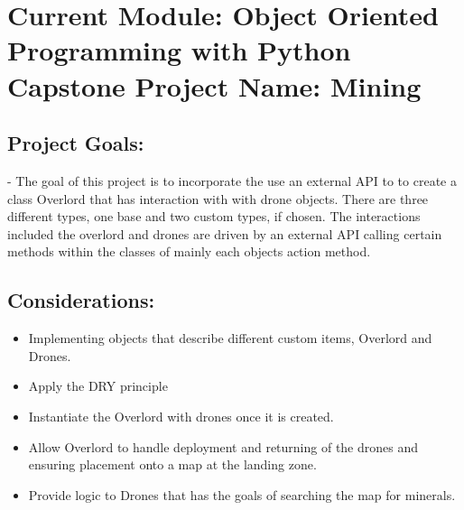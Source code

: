 \documentclass{article}
\begin{document}
\author{Guidry, Joseph}
\date{\ 22 SEPT 2017}

\section{Current Module: Object Oriented Programming with Python Capstone
Project Name:  Mining}

\subsection{Project Goals:}
	- The goal of this project is to incorporate the use an external API to to create a class Overlord that has interaction with with drone objects. There are three different types, one base and two custom types, if chosen.  The interactions included the overlord and drones are driven by an external API calling certain methods within the classes of mainly each objects action method. 
	
\subsection{Considerations:}
\begin{itemize}
    \item Implementing objects that describe different custom items, Overlord and Drones.
    \item Apply the DRY principle
    \item Instantiate the Overlord with drones once it is created.
    \item Allow Overlord to handle deployment and returning of the drones and ensuring placement onto a map at the landing zone.
    \item Provide logic to Drones that has the goals of searching the map for minerals. 
\end{itemize}
\end{document}
